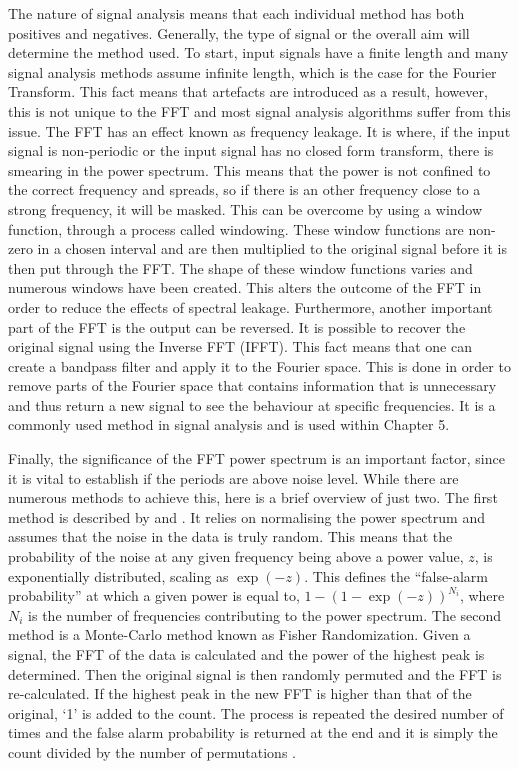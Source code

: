 	The nature of signal analysis means that each individual method has both positives and negatives.
	Generally, the type of signal or the overall aim will determine the method used.
	To start, input signals have a finite length and many signal analysis methods assume infinite length, which is the case for the Fourier Transform. 
	This fact means that artefacts are introduced as a result, however, this is not unique to the FFT and most signal analysis algorithms suffer from this issue. 
	The FFT has an effect known as frequency leakage.
    It is where, if the input signal is non-periodic or the input signal has no closed form transform, there is smearing in the power spectrum.
    This means that the power is not confined to the correct frequency and spreads, so if there is an other frequency close to a strong frequency, it will be masked.
	This can be overcome by using a window function, through a process called windowing. These window functions are non-zero in a chosen interval and are then multiplied to the original signal before it is then put through the FFT.
	The shape of these window functions varies and numerous windows have been created. 	
	This alters the outcome of the FFT in order to reduce the effects of spectral leakage.	
    Furthermore, another important part of the FFT is the output can be reversed.
    It is possible to recover the original signal using the Inverse FFT (IFFT).
    This fact means that one can create a bandpass filter and apply it to the Fourier space.
    This is done in order to remove parts of the Fourier space that contains information that is unnecessary and thus return a new signal to see the behaviour at specific frequencies.
    It is a commonly used method in signal analysis and is used within Chapter 5.
    
    Finally, the significance of the FFT power spectrum is an important factor, since it is vital to establish if the periods are above noise level.
    While there are numerous methods to achieve this, here is a brief overview of just two.
    The first method is described by \cite{1982ApJ...263..835S} and \cite{1986ApJ...302..757H}.
    It relies on normalising the power spectrum and assumes that the noise in the data is truly random. 
    This means that the probability of the noise at any given frequency being above a power value, $z$, is exponentially distributed, scaling as $\exp(-z)$.
    This defines the ``false-alarm probability'' at which a given power is equal to, $1 - (1 - \exp(-z))^{N_i}$, where $N_i$ is the number of frequencies contributing to the power spectrum.    
    The second method is a Monte-Carlo method known as Fisher Randomization.
    Given a signal, the FFT of the data is calculated and the power of the highest peak is determined.
    Then the original signal is then randomly permuted and the FFT is re-calculated. If the highest peak in the new FFT is higher than that of the original, `1' is added to the count.
    The process is repeated the desired number of times and the false alarm probability is returned at the end and it is simply the count divided by the number of permutations \citep{1985AJ.....90.2317L}. 
    
